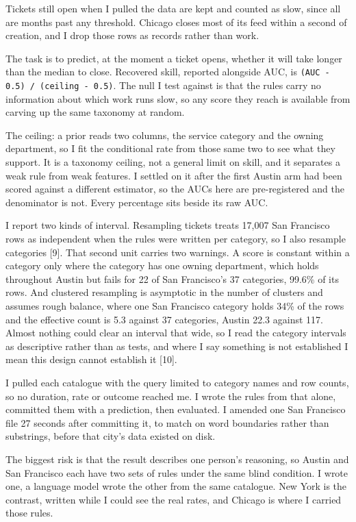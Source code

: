 \documentclass[10pt,a4paper,twocolumn]{article}
\begin{document}
Tickets still open when I pulled the data are kept and counted as slow, since all
are months past any threshold. Chicago closes most of its feed within a second of
creation, and I drop those rows as records rather than work.

The task is to predict, at the moment a ticket opens, whether it will take longer
than the median to close. Recovered skill, reported alongside AUC, is
\texttt{(AUC - 0.5) / (ceiling - 0.5)}. The null I test against is that the rules carry
no information about which work runs slow, so any score they reach is available
from carving up the same taxonomy at random.

The ceiling: a prior reads two columns, the service category and the owning
department, so I fit the conditional rate from those same two to see what they
support. It is a taxonomy ceiling, not a general limit on skill, and it separates
a weak rule from weak features. I settled on it after the first Austin arm had
been scored against a different estimator, so the AUCs here are pre-registered
and the denominator is not. Every percentage sits beside its raw AUC.

I report two kinds of interval. Resampling tickets treats 17,007 San Francisco
rows as independent when the rules were written per category, so I also resample
categories [9]. That second unit carries two warnings. A score is constant within
a category only where the category has one owning department, which holds
throughout Austin but fails for 22 of San Francisco's 37 categories, 99.6\% of its
rows. And clustered resampling is asymptotic in the number of clusters and
assumes rough balance, where one San Francisco category holds 34\% of the rows and
the effective count is 5.3 against 37 categories, Austin 22.3 against 117. Almost
nothing could clear an interval that wide, so I read the category intervals as
descriptive rather than as tests, and where I say something is not established I
mean this design cannot establish it [10].

I pulled each catalogue with the query limited to category names and row counts,
so no duration, rate or outcome reached me. I wrote the rules from that alone,
committed them with a prediction, then evaluated. I amended one San Francisco
file 27 seconds after committing it, to match on word boundaries rather than
substrings, before that city's data existed on disk.

The biggest risk is that the result describes one person's reasoning, so Austin
and San Francisco each have two sets of rules under the same blind condition. I
wrote one, a language model wrote the other from the same catalogue. New York is
the contrast, written while I could see the real rates, and Chicago is where I
carried those rules.
\end{document}
